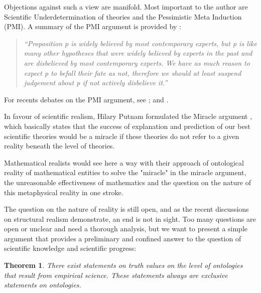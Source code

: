 \documentclass{article}
\newtheorem{theorem}{Theorem} %
\begin{document}
Objections against such a view are manifold. Most important to the author are Scientific Underdetermination of theories\cite[]{sep-scientific-underdetermination} and the Pessimistic Meta Induction (PMI)\cite[]{laudan1981confutation}. A summary of the PMI argument is provided by \cite[]{sep-structural-realism}: 

\begin{quote}
\textit{``Proposition p is widely believed by most contemporary experts, but p is like many other hypotheses that were widely believed by experts in the past and are disbelieved by most contemporary experts. We have as much reason to expect p to befall their fate as not, therefore we should at least suspend judgement about p if not actively disbelieve it.''}
\end{quote}

For recents debates on the PMI argument, see \cite[]{fahrbach2009pessimistic}; \cite[]{park2011confutation} and  \cite[]{muller2015pessimistic}. \newline

In favour of scientific realism, Hilary Putnam formulated the Miracle argument \cite[]{putnam1975mathematics}, which basically states that the success of explanation and prediction of our best scientific theories would be a miracle if these theories do not refer to a given reality beneath the level of theories. \newline 

Mathematical realists would see here a way with their approach of ontological reality of mathematical entities to solve the "miracle" in the miracle argument, the unreasonable effectiveness of mathematics \cite[]{wigner1960unreasonable} and the question on the nature of this metaphysical reality in one stroke. \newline

The question on the nature of reality is still open, and as the recent discussions on structural realism demonstrate, an end is not in sight. Too many questions are open or unclear and need a thorough analysis, but we want to present a simple argument that provides a preliminary and confined answer to the question of scientific knowledge and scientific progress:

\begin{theorem}
There exist statements on truth values on the level of ontologies that result from empirical science. These statements always are exclusive statements on ontologies.
\end{theorem}
\end{document}
